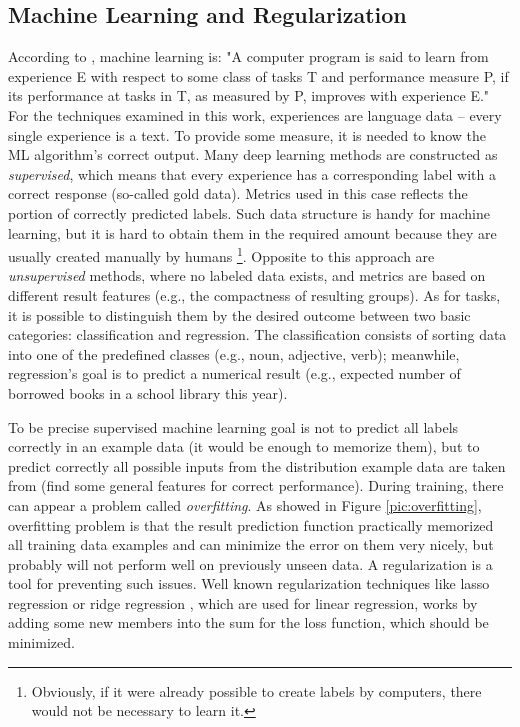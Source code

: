 \subsection{Machine Learning and Regularization}
\label{sub:ml}
According to \citep{Mitchell1997}, machine learning is: "A computer
program is said to learn from experience E with respect to some class of tasks T and performance measure P, if its performance at tasks in T, as measured by P, improves with experience E." For the techniques examined in this work, experiences are language data -- every single experience is a text. To provide some measure, it is needed to know the ML algorithm's correct output. Many deep learning methods are constructed as \textit{supervised}, which means that every experience has a corresponding label with a correct response (so-called gold data). Metrics used in this case reflects the portion of correctly predicted labels. \citep{Russell1995} Such data structure is handy for machine learning, but it is hard to obtain them in the required amount because they are usually created manually by humans \footnote{Obviously, if it were already possible to create labels by computers, there would not be necessary to learn it.}. Opposite to this approach are \textit{unsupervised} methods, where no labeled data exists, and metrics are based on different result features (e.g., the compactness of resulting groups). As for tasks, it is possible to distinguish them by the desired outcome between two basic categories: classification and regression. The classification consists of sorting data into one of the predefined classes (e.g., noun, adjective, verb); meanwhile, regression's goal is to predict a numerical result (e.g., expected number of borrowed books in a school library this year).
\par
To be precise supervised machine learning goal is not to predict all labels correctly in an example data (it would be enough to memorize them), but to predict correctly all possible inputs from the distribution example data are taken from (find some general features for correct performance). During training, there can appear a problem called \textit{overfitting}. As showed in Figure \ref{pic:overfitting}, overfitting problem is that the result prediction function practically memorized all training data examples and can minimize the error on them very nicely, but probably will not perform well on previously unseen data. A regularization is a tool for preventing such issues. Well known regularization techniques like lasso regression \citep{Tibshirani1996} or ridge regression \citep{Hoerl1970}, which are used for linear regression, works by adding some new members into the sum for the loss function, which should be minimized.
